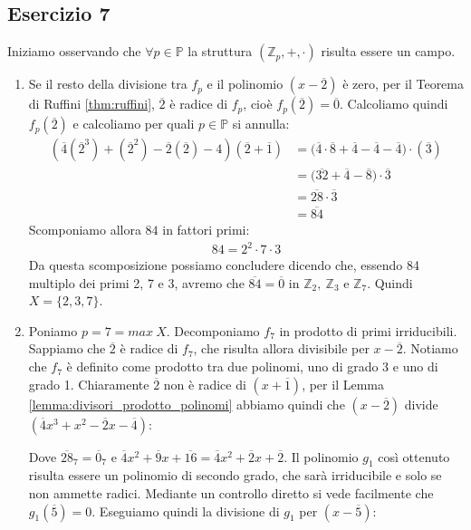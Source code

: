 \subsection*{Esercizio 7} Iniziamo osservando che $\forall p \in \mathbb{P}$ la struttura $(\mathbb{Z}_{p},+,\cdot)$ risulta essere un campo.
\begin{enumerate}[label=(\textit{\roman*})]
	\item Se il resto della divisione tra $f_{p}$ e il polinomio $(x-\overline{2})$ è zero, per il Teorema di Ruffini \ref{thm:ruffini}, $\overline{2}$ è radice di $f_{p}$, cioè $f_{p}(\overline{2})=\overline{0}$. Calcoliamo quindi $f_{p}(\overline{2})$ e calcoliamo per quali $p \in \mathbb{P}$ si annulla:
	\begin{align*}
		(\overline{4}(\overline{2}^{3})+(\overline{2}^{2})-\overline{2}(\overline{2})-4)(\overline{2}+\overline{1}) &= \bigl(\overline{4}\cdot \overline{8} + \overline{4} - \overline{4} - \overline{4}\bigr)\cdot(\overline{3}) \\
		&=\bigl(\overline{32}+\overline{4}-\overline{8}\bigr) \cdot \overline{3} \\
		&=\overline{28} \cdot \overline{3} \\
		&= \overline{84}
	\end{align*}
	Scomponiamo allora $84$ in fattori primi:
	\begin{align*}
		84 = 2^{2} \cdot 7 \cdot 3
	\end{align*}
	Da questa scomposizione possiamo concludere dicendo che, essendo 84 multiplo dei primi 2, 7 e 3, avremo che $\overline{84}=\overline{0}$ in $\mathbb{Z}_{2}, \ \mathbb{Z}_{3}$ e $\mathbb{Z}_{7}$. Quindi $X=\{2,3,7\}$.
	\item Poniamo $p=7=max \ X$. Decomponiamo $f_{7}$ in prodotto di primi irriducibili. Sappiamo che $\overline{2}$ è radice di $f_{7}$, che risulta allora divisibile per $x-\overline{2}$. Notiamo che $f_{7}$ è definito come prodotto tra due polinomi, uno di grado 3 e uno di grado 1. Chiaramente $\overline{2}$ non è radice di $(x+\overline{1})$, per il Lemma \ref{lemma:divisori_prodotto_polinomi} abbiamo quindi che $(x-\overline{2})$ divide $(\overline{4}x^{3}+x^{2}-\overline{2}x-\overline{4})$:
	\begin{center}
	\end{center}
	Dove $\overline{28}_{7}=\overline{0}_{7}$ e $\overline{4}x^{2} + \overline{9}x + \overline{16} = \overline{4}x^{2}+\overline{2}x+\overline{2}$. Il polinomio $g_{1}$ così ottenuto risulta essere un polinomio di secondo grado, che sarà irriducibile e solo se non ammette radici. Mediante un controllo diretto si vede facilmente che $g_{1}(\overline{5})=0$. Eseguiamo quindi la divisione di $g_{1}$ per $(x-\overline{5})$:

\end{enumerate}
